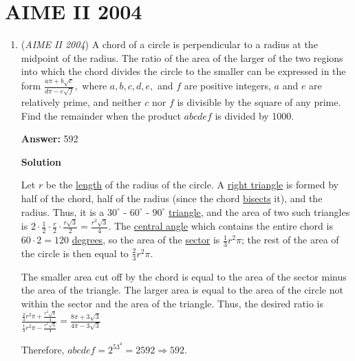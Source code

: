 \section{AIME II 2004}
        \begin{enumerate}
        	\item (\textit{AIME II 2004}) A chord of a circle is perpendicular to a radius at the midpoint of the radius. The ratio of the area of the larger of the two regions into which the chord divides the circle to the smaller can be expressed in the form $\frac{a\pi+b\sqrt{c}}{d\pi-e\sqrt{f}},$ where $a, b, c, d, e,$ and $f$ are positive integers, $a$ and $e$ are relatively prime, and neither $c$ nor $f$ is divisible by the square of any prime. Find the remainder when the product $abcdef$ is divided by 1000.


 
 \textbf{Answer: }592



\textbf{Solution}

Let $r$ be the \href{https://artofproblemsolving.com/wiki/index.php?title=Length}{length} of the radius of the circle.  A \href{https://artofproblemsolving.com/wiki/index.php?title=Right\_triangle}{right triangle} is formed by half of the chord, half of the radius (since the chord \href{https://artofproblemsolving.com/wiki/index.php?title=Bisect}{bisects} it), and the radius. Thus, it is a $30^\circ$ - $60^\circ$ - $90^\circ$ \href{https://artofproblemsolving.com/wiki/index.php?title=Triangle}{triangle}, and the area of two such triangles is $2 \cdot \frac{1}{2} \cdot \frac{r}{2} \cdot \frac{r\sqrt{3}}{2} = \frac{r^2\sqrt{3}}{4}$. The \href{https://artofproblemsolving.com/wiki/index.php?title=Central\_angle}{central angle} which contains the entire chord is $60 \cdot 2 = 120$ \href{https://artofproblemsolving.com/wiki/index.php?title=Degree}{degrees}, so the area of the \href{https://artofproblemsolving.com/wiki/index.php?title=Sector}{sector} is $\frac{1}{3}r^2\pi$; the rest of the area of the circle is then equal to $\frac{2}{3}r^2\pi$.

 The smaller area cut off by the chord is equal to the area of the sector minus the area of the triangle. The larger area is equal to the area of the circle not within the sector and the area of the triangle. Thus, the desired ratio is $\frac{\frac{2}{3}r^2\pi + \frac{r^2\sqrt{3}}{4}}{\frac{1}{3}r^2\pi - \frac{r^2\sqrt{3}}{4}} =  \frac{8\pi + 3\sqrt{3}}{4\pi - 3\sqrt{3}}$

 Therefore, $abcdef = 2^53^4 = 2592 \Longrightarrow \boxed{592}$.


\end{enumerate}
